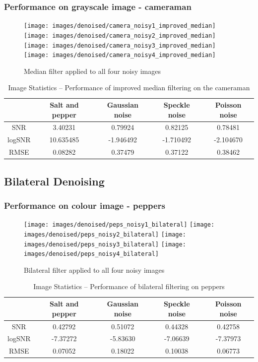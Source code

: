 \documentclass{article}
\begin{document}
\subsubsection{Performance on grayscale image - cameraman}
\begin{figure}[H]
  \centering
  \texttt{[image: images/denoised/camera\_noisy1\_improved\_median]}
  \texttt{[image: images/denoised/camera\_noisy2\_improved\_median]}
  \texttt{[image: images/denoised/camera\_noisy3\_improved\_median]}
  \texttt{[image: images/denoised/camera\_noisy4\_improved\_median]}
  \caption{Median filter applied to all four noisy images }
\end{figure}
\begin{table}[H]
  \centering
  \begin{tabular}{c|c|c|c|c}
    & Salt and pepper & Gaussian noise & Speckle noise & Poisson noise \\
    \hline
    SNR    & 3.40231   & 0.79924   & 0.82125   & 0.78481  \\
    logSNR & 10.635485 & -1.946492 & -1.710492 & -2.104670 \\
    RMSE   & 0.08282   & 0.37479   & 0.37122   & 0.38462  \\
  \end{tabular}
  \caption{Image Statistics -- Performance of improved median filtering on the cameraman}
\end{table}

% 
\subsection{Bilateral Denoising}
\label{subsec:bilateral-denoise}
\subsubsection{Performance on colour image - peppers}
\begin{figure}[H]
  \centering
  \texttt{[image: images/denoised/peps\_noisy1\_bilateral]}
  \texttt{[image: images/denoised/peps\_noisy2\_bilateral]}
  \texttt{[image: images/denoised/peps\_noisy3\_bilateral]}
  \texttt{[image: images/denoised/peps\_noisy4\_bilateral]}
  \caption{Bilateral filter applied to all four noisy images}
\end{figure}
\begin{table}[H]
  \centering
  \begin{tabular}{c | c | c | c | c}
    & Salt and pepper & Gaussian noise & Speckle noise & Poisson noise \\
    \hline
    SNR    & 0.42792  & 0.51072  & 0.44328  & 0.42758  \\
    logSNR & -7.37272 & -5.83630 & -7.06639 & -7.37973 \\
    RMSE   & 0.07052  & 0.18022  & 0.10038  & 0.06773  \\
  \end{tabular}
  \caption{Image Statistics -- Performance of bilateral filtering on peppers}
  \label{table:}
\end{table}
%
%
\end{document}
